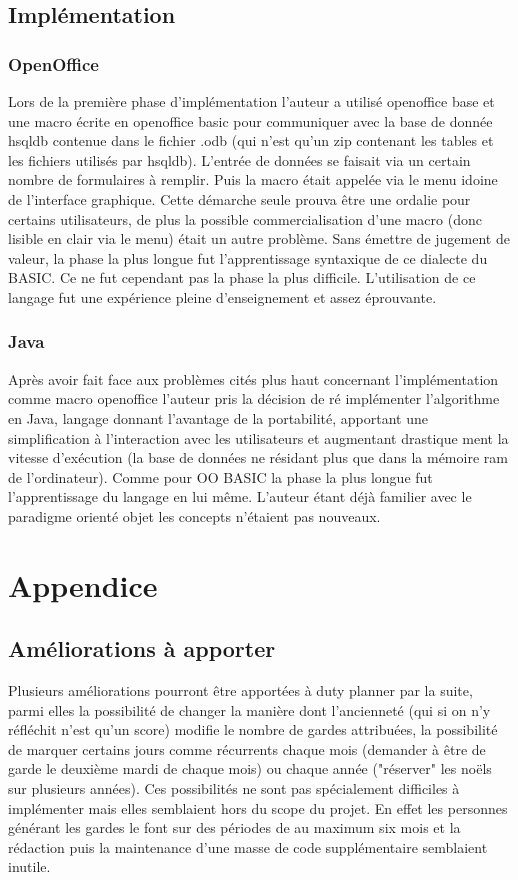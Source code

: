 \documentclass[11pt]{report}
\begin{document}
\section{Implémentation}
\subsection{OpenOffice}
	Lors de la première phase d'implémentation l'auteur a utilisé openoffice base et une macro écrite en openoffice basic pour communiquer avec la base de donnée hsqldb contenue dans le fichier .odb (qui n'est qu'un zip contenant les tables et les fichiers utilisés par hsqldb).
 L'entrée de données se faisait via un certain nombre de formulaires à remplir. 
Puis la macro était appelée via le menu idoine de l'interface graphique.
Cette démarche  seule prouva être une ordalie pour certains utilisateurs, de plus la possible commercialisation d'une macro (donc lisible en clair via le menu) était un autre problème.
Sans émettre de jugement de valeur, la phase la plus longue fut l'apprentissage syntaxique de ce dialecte du BASIC.
Ce ne fut cependant pas la phase la plus difficile. L'utilisation de ce langage fut une expérience pleine d'enseignement et assez éprouvante.

\subsection{Java}

Après avoir fait face aux problèmes cités plus haut concernant l'implémentation comme macro openoffice l'auteur pris la décision de ré implémenter l'algorithme en Java, langage donnant l'avantage de la portabilité, apportant une simplification à l'interaction avec les utilisateurs et augmentant drastique ment la vitesse d'exécution (la base de données ne résidant plus que dans la mémoire ram de l'ordinateur). Comme pour OO BASIC la phase la plus longue fut l'apprentissage du langage en lui même. L'auteur étant déjà familier avec le paradigme orienté objet les concepts n'étaient pas nouveaux.

\chapter{Appendice}
\section{Améliorations à apporter}
Plusieurs améliorations pourront être apportées à duty planner par la suite, parmi elles la possibilité de changer la manière dont l'ancienneté (qui si on n'y réfléchit n'est qu'un score) modifie le nombre de gardes attribuées, la possibilité de marquer certains jours comme récurrents chaque mois (demander à être de garde le deuxième mardi de chaque mois) ou chaque année ("réserver" les noëls sur plusieurs années).
 Ces possibilités ne sont pas spécialement difficiles à implémenter mais elles semblaient hors du scope du projet. 
En effet les personnes générant les gardes le font sur des périodes de au maximum six mois et la rédaction puis la maintenance d'une masse de code supplémentaire semblaient inutile\cite{yagn}.
\end{document}
